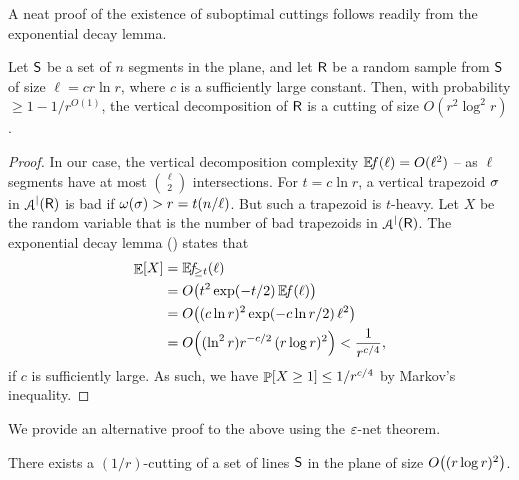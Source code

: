 A neat proof of the existence of suboptimal cuttings follows readily
from the exponential decay lemma.

\begin{lemma}
    Let $\mathsf{S}$ be a set of $n$ segments in the plane, and let
    $\mathsf{R}$ be a random sample from $\mathsf{S}$ of size
    $\ell = c r \ln r$, where $c$ is a sufficiently large
    constant. Then, with probability $\geq 1-1/r^{O(1)}$, the vertical
    decomposition of $\mathsf{R}$ is a cutting of size
    $O( r^2 \log^2 r)$.
\end{lemma}
\begin{proof}
    In our case, the vertical decomposition complexity
    $\NumOfRegionsZero{ \ell} = O(\ell^2)$ -- as $\ell$ segments have
    at most $\binom{\ell}{2}$ intersections.  For $t = c \ln r$, a
    vertical trapezoid $\sigma$ in $\ArrVD{\Sample}$ is bad if
    $\WeightX{\Trap} > r = t(n/\ell)$. But such a trapezoid is
    $t$-heavy.  Let $X$ be the random variable that is the number of
    bad trapezoids in $\ArrVD{\Sample}$. The exponential decay lemma
    () states that
    \begin{align*}
        \Ex{X} &=
        \NumOfRegions{t}{\ell}  %
        \\ &=%
        O\bigl( t^2
        \exp\pth{-t/2} \,  \NumOfRegionsZero{ \ell}
        \bigr)
        \\
        &=
        O\bigl( (c \ln r)^2
        \exp\pth{-c\ln r/2} \,  \ell^2
        \bigr)
        \\
        &=
        O\Bigl(  (\ln^2 r)
        r^{-c /2} \,  (r \log r)^2
        \Bigr)
        <%
        \frac{1}{r^{c/4}},
    \end{align*}
    if $c$ is sufficiently large.  As such, we have
    $\Prob{X \geq 1} \leq {1}/{r^{c/4}}$ by Markov's inequality.
\end{proof}

We provide an alternative proof to the above using the ${\varepsilon}$-net
theorem.
\begin{lemma}
    There exists a $(1/r)$-cutting of a set of lines $\mathsf{S}$ in the
    plane of size $O\pth{ (r\log r)^2 }$.
\end{lemma}

